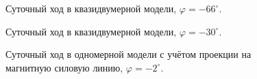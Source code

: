 \documentclass[14pt, a4paper, fleqn, twoside]{extreport}
\begin{document}
\begin{figure}[H]
\caption{Суточный ход в квазидвумерной модели, $\varphi = -66^\circ$.}
\end{figure}

\begin{figure}[H]
\caption{Суточный ход в квазидвумерной модели, $\varphi = -30^\circ$.}
\end{figure}

\begin{figure}[H]
\caption{Суточный ход в одномерной модели с учётом проекции на магнитную силовую линию, $\varphi = -2^\circ$.}
\end{figure}
\end{document}
